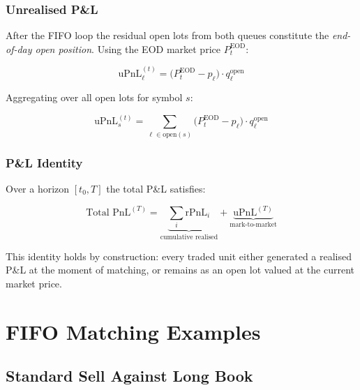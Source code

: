 \documentclass[11pt, a4paper]{article}
\begin{document}
\subsubsection{Unrealised P\&L}

After the FIFO loop the residual open lots from both queues
constitute the \emph{end-of-day open position}.
Using the EOD market price $P_t^{\text{EOD}}$:

\begin{equation}
  \text{uPnL}_\ell^{(t)} =
    \bigl(P_t^{\text{EOD}} - p_\ell\bigr)\cdot q_\ell^{\text{open}}
  \label{eq:upnl}
\end{equation}

Aggregating over all open lots for symbol $s$:

\begin{equation}
  \text{uPnL}_s^{(t)} =
    \sum_{\ell \in \text{open}(s)}
    \bigl(P_t^{\text{EOD}} - p_\ell\bigr)\cdot q_\ell^{\text{open}}
\end{equation}

\subsubsection{P\&L Identity}

Over a horizon $[t_0, T]$ the total P\&L satisfies:

\begin{equation}
  \text{Total PnL}^{(T)} =
    \underbrace{\sum_i \text{rPnL}_i}_{\text{cumulative realised}}
    +\underbrace{\text{uPnL}^{(T)}}_{\text{mark-to-market}}
\end{equation}

This identity holds by construction: every traded unit either
generated a realised P\&L at the moment of matching, or remains
as an open lot valued at the current market price.

\section{FIFO Matching Examples}

\subsection{Standard Sell Against Long Book}
\end{document}
